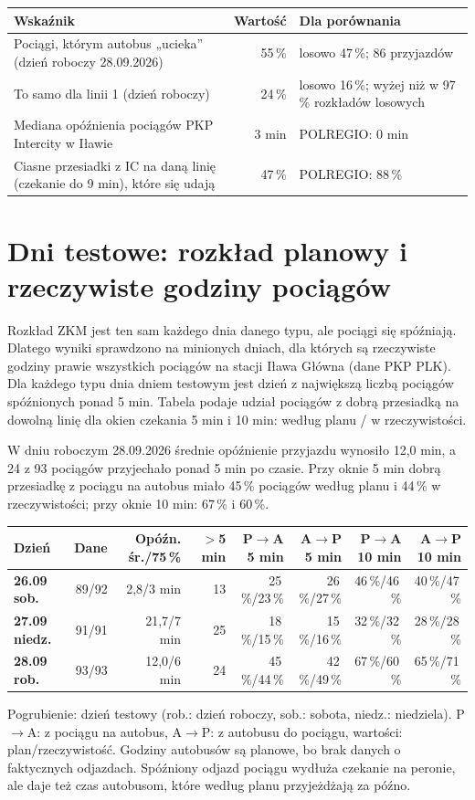 \documentclass[10pt,a4paper]{article}
\newcommand{\mut}[1]{\textcolor{muted}{#1}}
\begin{document}
{\small
\begin{center}\begin{tabular}{@{}p{9.2cm} r p{4.2cm}@{}}\toprule
Wskaźnik & Wartość & Dla porównania \\ \midrule
Pociągi, którym autobus „ucieka” (dzień roboczy 28.09.2026) & 55\,\% & losowo 47\,\%; 86 przyjazdów \\
To samo dla linii 1 (dzień roboczy) & 24\,\% & losowo 16\,\%; wyżej niż w 97\,\% rozkładów losowych \\
Mediana opóźnienia pociągów PKP Intercity w Iławie & 3 min & POLREGIO: 0 min \\
Ciasne przesiadki z IC na daną linię (czekanie do 9 min), które się udają & 47\,\% & POLREGIO: 88\,\% \\
\bottomrule\end{tabular}\end{center}}
\section{Dni testowe: rozkład planowy i rzeczywiste godziny pociągów}
Rozkład ZKM jest ten sam każdego dnia danego typu, ale pociągi się spóźniają. Dlatego wyniki sprawdzono na minionych dniach, dla których są rzeczywiste godziny prawie wszystkich pociągów na stacji Iława Główna (dane PKP PLK). Dla każdego typu dnia dniem testowym jest dzień z największą liczbą pociągów spóźnionych ponad 5 min. Tabela podaje udział pociągów z dobrą przesiadką na dowolną linię dla okien czekania 5 min i 10 min: według planu / w rzeczywistości.

W dniu roboczym 28.09.2026 średnie opóźnienie przyjazdu wynosiło 12,0 min, a 24 z 93 pociągów przyjechało ponad 5 min po czasie. Przy oknie 5 min dobrą przesiadkę z pociągu na autobus miało 45\,\% pociągów według planu i 44\,\% w rzeczywistości; przy oknie 10 min: 67\,\% i 60\,\%.

{\footnotesize
\begin{center}\begin{tabular}{@{}l r r r r r r r@{}}\toprule
Dzień & Dane & Opóźn. śr./75\,\% & $>$5 min & P$\to$A 5 min & A$\to$P 5 min & P$\to$A 10 min & A$\to$P 10 min \\ \midrule
\textbf{26.09 sob.} & 89/92 & 2,8/3 min & 13 & 25\,\%/23\,\% & 26\,\%/27\,\% & 46\,\%/46\,\% & 40\,\%/47\,\% \\
\textbf{27.09 niedz.} & 91/91 & 21,7/7 min & 25 & 18\,\%/15\,\% & 15\,\%/16\,\% & 32\,\%/32\,\% & 28\,\%/28\,\% \\
\textbf{28.09 rob.} & 93/93 & 12,0/6 min & 24 & 45\,\%/44\,\% & 42\,\%/49\,\% & 67\,\%/60\,\% & 65\,\%/71\,\% \\
\bottomrule\end{tabular}\end{center}}
\mut{\footnotesize Pogrubienie: dzień testowy (rob.: dzień roboczy, sob.: sobota, niedz.: niedziela). P$\to$A: z pociągu na autobus, A$\to$P: z autobusu do pociągu, wartości: plan/rzeczywistość. Godziny autobusów są planowe, bo brak danych o faktycznych odjazdach. Spóźniony odjazd pociągu wydłuża czekanie na peronie, ale daje też czas autobusom, które według planu przyjeżdżają za późno.}
\end{document}
